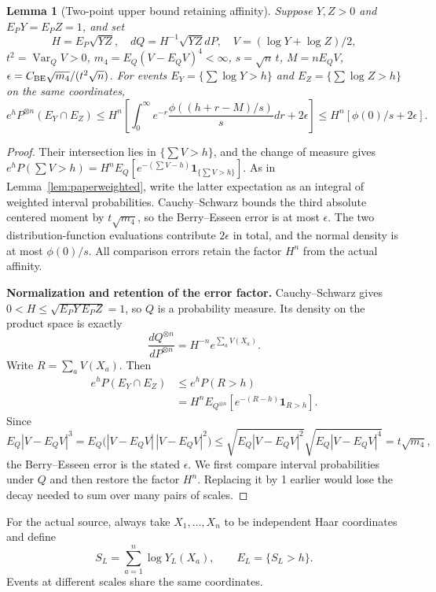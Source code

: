 \documentclass[a4paper,11pt]{article}
\newtheorem{lemma}{Lemma}[section]
\theoremstyle{remark}
\begin{document}
\begin{lemma}[Two-point upper bound retaining affinity]\label{lem:paperpair}
Suppose $Y,Z>0$ and $E_PY=E_PZ=1$, and set
\[
 H=E_P\sqrt{YZ},\quad dQ=H^{-1}\sqrt{YZ}dP,
 \quad V=(\log Y+\log Z)/2,
\]
$t^2=\operatorname{Var}_QV>0$, $m_4=E_Q(V-E_QV)^4<\infty$,
$s=\sqrt n\,t$, $M=nE_QV$, $\epsilon=C_{\rm BE}\sqrt{m_4}/(t^2\sqrt n)$.
For events $E_Y=\{\sum\log Y>h\}$ and $E_Z=\{\sum\log Z>h\}$ on the same coordinates,
\[
 e^hP^{\otimes n}(E_Y\cap E_Z)
 \le H^n\left[\int_0^\infty e^{-r}\frac{\phi((h+r-M)/s)}s dr+2\epsilon\right]
 \le H^n[\phi(0)/s+2\epsilon].
\]
\end{lemma}
\begin{proof}
Their intersection lies in $\{\sum V>h\}$, and the change of measure gives
$e^hP(\sum V>h)=H^nE_Q[e^{-(\sum V-h)}\mathbf1_{\{\sum V>h\}}]$.
As in Lemma~\ref{lem:paperweighted}, write the latter expectation as an integral of weighted interval probabilities.
Cauchy--Schwarz bounds the third absolute centered moment by $t\sqrt{m_4}$, so the Berry--Esseen error is at most
$\epsilon$. The two distribution-function evaluations contribute $2\epsilon$ in total, and the normal density is at most $\phi(0)/s$.
All comparison errors retain the factor $H^n$ from the actual affinity.

\medskip\noindent\textbf{Normalization and retention of the error factor.}
Cauchy--Schwarz gives $0<H\le\sqrt{E_PY\,E_PZ}=1$, so $Q$ is a probability measure.
Its density on the product space is exactly
\[
 \frac{dQ^{\otimes n}}{dP^{\otimes n}}=H^{-n}e^{\sum_aV(X_a)}.
\]
Write $R=\sum_aV(X_a)$. Then
\begin{align*}
 e^hP(E_Y\cap E_Z)
 &\le e^hP(R>h)\\
 &=H^nE_{Q^{\otimes n}}[e^{-(R-h)}\mathbf1_{R>h}].
\end{align*}
Since
\[
 E_Q|V-E_QV|^3
 =E_Q\bigl(|V-E_QV|\,|V-E_QV|^2\bigr)
 \le\sqrt{E_Q|V-E_QV|^2}\sqrt{E_Q|V-E_QV|^4}
 =t\sqrt{m_4},
\]
the Berry--Esseen error is the stated $\epsilon$. We first compare interval probabilities under $Q$ and then
restore the factor $H^n$. Replacing it by 1 earlier would lose the decay needed to sum over many pairs of scales.

\end{proof}

For the actual source, always take $X_1,\ldots,X_n$ to be independent Haar coordinates and define
\[
 S_L=\sum_{a=1}^n\log Y_L(X_a),\qquad E_L=\{S_L>h\}.
\]
Events at different scales share the same coordinates.
\end{document}
